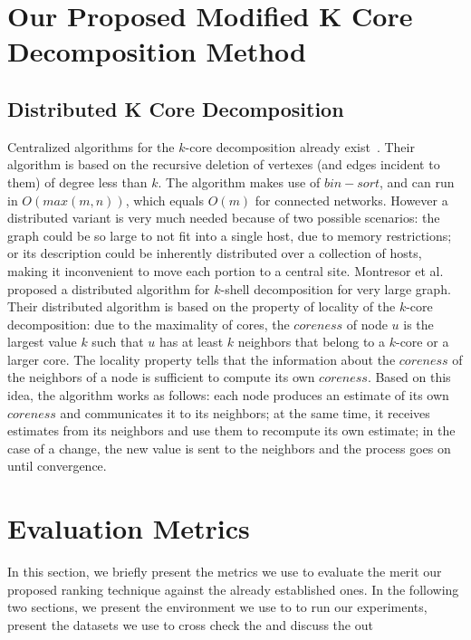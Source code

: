 \documentclass[sigconf]{acmart}
\begin{document}
\section{Our Proposed Modified K Core Decomposition Method}

\subsection{Distributed K Core Decomposition}
\label{distributed k core}
Centralized algorithms for the $k$-core decomposition already exist~\cite{batagelj2011fast}. Their algorithm is based on the recursive deletion of vertexes (and edges incident to them)
of degree less than $k$. The algorithm makes use of $bin-sort$, and can run in $O(max(m,n))$, which equals $O(m)$ for connected networks. However a distributed variant is very much needed because of two possible scenarios: the graph could be so large to not fit into a single host, due to memory restrictions; or its description could be inherently distributed over a collection of hosts, making it inconvenient to move each portion to a central site. Montresor et al.~\cite{montresor2013distributed} proposed a distributed algorithm for $k$-shell decomposition for very large graph. Their distributed algorithm is based on the property of locality of the $k$-core decomposition: due to the maximality of cores, the $coreness$ of node $u$ is the largest value $k$ such that $u$ has at least $k$ neighbors that belong to a $k$-core or a larger core. The locality property tells that the information about the $coreness$ of the neighbors of a node is sufficient to compute its own $coreness$. Based on this idea, the algorithm works as follows: each node produces an estimate of its own $coreness$ and communicates it to its neighbors; at the same time, it receives estimates from its neighbors and use them to recompute its own estimate; in the case of a change, the new value is sent to the neighbors and the process goes on until convergence.



\section{Evaluation Metrics}
In this section, we briefly present the metrics we use to evaluate the merit our proposed ranking technique against the already established ones. In the following two sections, we present the environment we use to to run our experiments, present the datasets we use to cross check the  and discuss the out 
\end{document}
